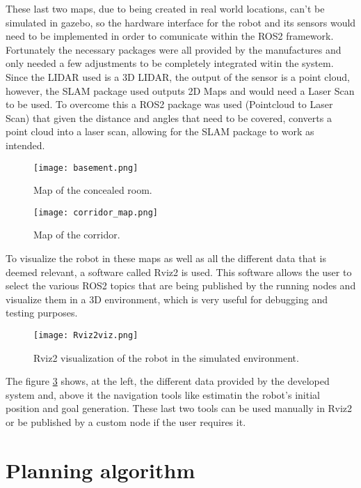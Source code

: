 These last two maps, due to being created in real world locations, can't be 
simulated in gazebo, so the hardware interface for the robot and its sensors 
would need to be implemented in order to comunicate within the \gls{ROS2} framework. 
Fortunately the necessary packages were all provided by the manufactures \cite{ScoutRepo, RoboSense} and only needed a few adjustments to 
be completely integrated witin the system. Since the LIDAR used is a 3D LIDAR, the output 
of the sensor is a point cloud, however, the \gls{SLAM} package used outputs 2D Maps and would need a 
Laser Scan to be used. To overcome this a \gls{ROS2} package was used (Pointcloud to Laser Scan) that 
given the distance and angles that need to be covered, converts a point cloud into a laser scan, 
allowing for the \gls{SLAM} package to work as intended.
\begin{figure}[H]
    \centering
    \texttt{[image: basement.png]}
    \caption{Map of the concealed room.}
    \label{fig:basement_map}
\end{figure}
\begin{figure}[H]
    \centering
    \texttt{[image: corridor\_map.png]}
    \caption{Map of the corridor.}
    \label{fig:corridor_map}
\end{figure}

To visualize the robot in these maps as well as all the different data that is deemed relevant, a software called 
Rviz2 is used. This software allows the user to select the various \gls{ROS2} topics that are being published 
by the running nodes and visualize them in a 3D environment, which is very useful for debugging and testing purposes.
\begin{figure}[H]
    \centering
    \texttt{[image: Rviz2viz.png]}
    \caption{Rviz2 visualization of the robot in the simulated environment.}
    \label{fig:rviz2_visualization}
\end{figure}

The figure \ref{fig:rviz2_visualization} shows, at the left, the different data provided by the developed system and, above it the 
navigation tools like estimatin the robot's initial position and goal generation. These last two tools can be used manually 
in Rviz2 or be published by a custom node if the user requires it.

\section{Planning algorithm}
\label{sec:planning_algorithm}

